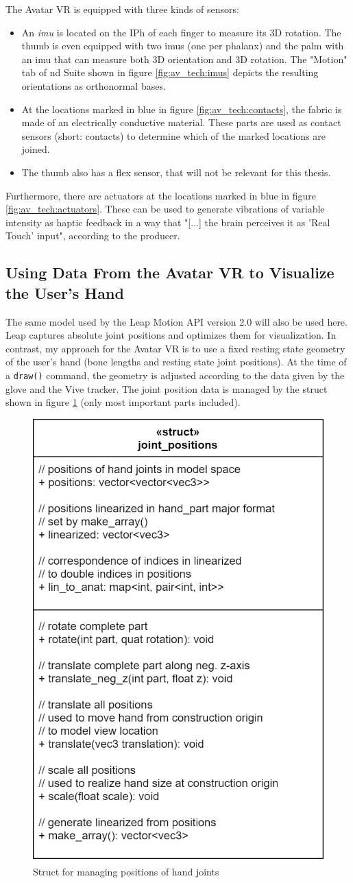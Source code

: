 \documentclass[hyperref, bachelorofscience]{cgvpub}
\begin{document}
The Avatar VR is equipped with three kinds of sensors: 
\begin{itemize}
	\item An \emph{\acrfull{imu}} is located on the \gls{IPh} of each finger to measure its 3D rotation. The thumb is even equipped with two \acrshort{imu}s (one per phalanx) and the palm with an \acrshort{imu} that can measure both 3D orientation and 3D rotation. The "Motion" tab of \acrshort{nd} Suite shown in figure \ref{fig:av_tech:imus} depicts the resulting orientations as orthonormal bases. 
	\item At the locations marked in blue in figure \ref{fig:av_tech:contacts}, the fabric is made of an electrically conductive material. These parts are used as contact sensors (short: contacts) to determine which of the marked locations are joined.
	\item The thumb also has a flex sensor, that will not be relevant for this thesis.
\end{itemize}

Furthermore, there are actuators at the locations marked in blue in figure \ref{fig:av_tech:actuators}. These can be used to generate vibrations of variable intensity as haptic feedback in a way that "[$\dots$] the brain perceives it as 'Real Touch' input", according to the producer.

\subsection{Using Data From the Avatar VR to Visualize the User's Hand}
The same model used by the Leap Motion API version 2.0 will also be used here. Leap captures absolute joint positions and optimizes them for visualization. In contrast, my approach for the Avatar VR is to use a fixed resting state geometry of the user's hand (bone lengths and resting state joint positions). At the time of a \lstinline|draw()| command, the geometry is adjusted according to the data given by the glove and the Vive tracker. The joint position data is managed by the struct shown in figure \ref{fig:joint_positions} (only most important parts included).

\begin{figure}
	\includegraphics[width=.4\linewidth]{../pics/joint_positions}
	\caption{Struct for managing positions of hand joints}
	\label{fig:joint_positions}
\end{figure}
\end{document}
